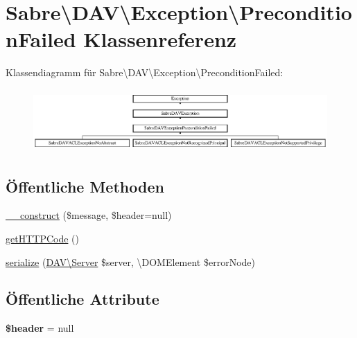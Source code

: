 \hypertarget{class_sabre_1_1_d_a_v_1_1_exception_1_1_precondition_failed}{}\section{Sabre\textbackslash{}D\+AV\textbackslash{}Exception\textbackslash{}Precondition\+Failed Klassenreferenz}
\label{class_sabre_1_1_d_a_v_1_1_exception_1_1_precondition_failed}
Klassendiagramm für Sabre\textbackslash{}D\+AV\textbackslash{}Exception\textbackslash{}Precondition\+Failed\+:\begin{figure}[H]
\begin{center}
\leavevmode
\includegraphics[height=2.424242cm]{class_sabre_1_1_d_a_v_1_1_exception_1_1_precondition_failed}
\end{center}
\end{figure}
\subsection*{Öffentliche Methoden}
\begin{DoxyCompactItemize}
\item 
\mbox{\hyperlink{class_sabre_1_1_d_a_v_1_1_exception_1_1_precondition_failed_a38dd5ca25a054e91ba4588f81f8fee56}{\+\_\+\+\_\+construct}} (\$message, \$header=null)
\item 
\mbox{\hyperlink{class_sabre_1_1_d_a_v_1_1_exception_1_1_precondition_failed_a07902c58c68484ff06d0f5f13e938ef1}{get\+H\+T\+T\+P\+Code}} ()
\item 
\mbox{\hyperlink{class_sabre_1_1_d_a_v_1_1_exception_1_1_precondition_failed_af16008139fcde33292ae35666e271a5d}{serialize}} (\mbox{\hyperlink{class_sabre_1_1_d_a_v_1_1_server}{D\+A\+V\textbackslash{}\+Server}} \$server, \textbackslash{}D\+O\+M\+Element \$error\+Node)
\end{DoxyCompactItemize}
\subsection*{Öffentliche Attribute}
\begin{DoxyCompactItemize}
\item 
\mbox{\label{class_sabre_1_1_d_a_v_1_1_exception_1_1_precondition_failed_a35e503e3cce7903ce80a2c6388088b41}} 
{\bfseries \$header} = null
\end{DoxyCompactItemize}


